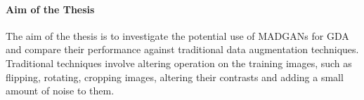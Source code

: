 \paragraph{Aim of the Thesis}\label{aim_of_the_thesis}
The aim of the thesis is to investigate the potential use of MADGANs for GDA and compare their performance against traditional data augmentation techniques. Traditional techniques involve altering operation on the training images, such as flipping, rotating, cropping images, altering their contrasts and adding a small amount of noise to them.


\newpage
